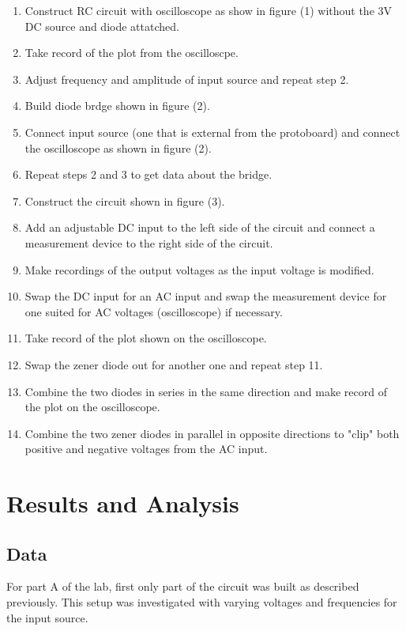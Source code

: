 \documentclass[twocolumn, amsmath]{revtex4}
\begin{document}
\begin{enumerate}
    \item Construct RC circuit with oscilloscope as show in figure (1) without the 3V DC source and diode attatched.
    \item Take record of the plot from the oscilloscpe.
    \item Adjust frequency and amplitude of input source and repeat step 2.
    \item Build diode brdge shown in figure (2).
    \item Connect input source (one that is external from the protoboard) and connect the oscilloscope as shown in figure (2).
    \item Repeat steps 2 and 3 to get data about the bridge.
    \item Construct the circuit shown in figure (3).
    \item Add an adjustable DC input to the left side of the circuit and connect a measurement device to the right side of the circuit.
    \item Make recordings of the output voltages as the input voltage is modified.
    \item Swap the DC input for an AC input and swap the measurement device for one suited for AC voltages (oscilloscope) if necessary.
    \item Take record of the plot shown on the oscilloscope.
    \item Swap the zener diode out for another one and repeat step 11.
    \item Combine the two diodes in series in the same direction and make record of the plot on the oscilloscope.
    \item Combine the two zener diodes in parallel in opposite directions to "clip" both positive and negative voltages from the AC input.
\end{enumerate}


\section{Results and Analysis}

\subsection{Data}
For part A of the lab, first only part of the circuit was built as described previously. This setup was investigated with varying voltages and frequencies for the input source.
\end{document}
